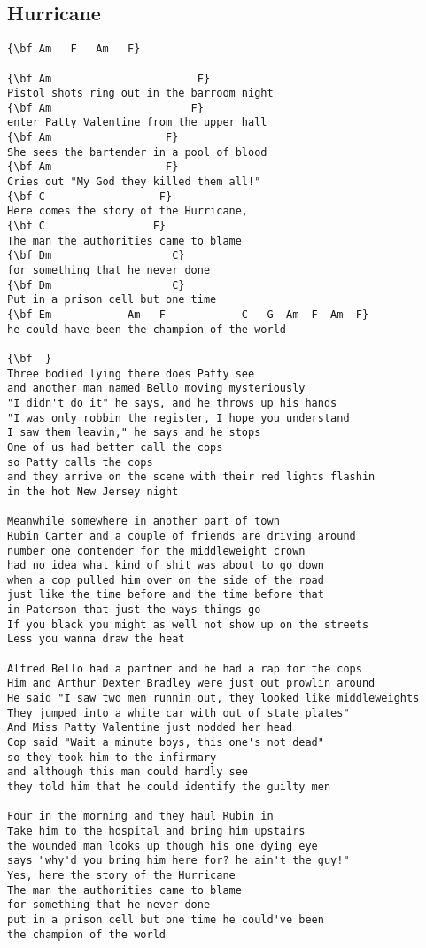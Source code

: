 \documentclass[a4paper]{article}
\begin{document}
\newpage
\subsection{Hurricane} %
\label{sub:Hurricane}
\begin{Verbatim}[commandchars=\\\{\}]
{\bf Am   F   Am   F}

{\bf Am                       F}
Pistol shots ring out in the barroom night
{\bf Am                      F}
enter Patty Valentine from the upper hall
{\bf Am                  F}
She sees the bartender in a pool of blood
{\bf Am                  F}
Cries out "My God they killed them all!"
{\bf C                  F}
Here comes the story of the Hurricane,
{\bf C                 F}
The man the authorities came to blame
{\bf Dm                   C}
for something that he never done
{\bf Dm                   C}
Put in a prison cell but one time
{\bf Em            Am   F            C   G  Am  F  Am  F}
he could have been the champion of the world

{\bf  }
Three bodied lying there does Patty see
and another man named Bello moving mysteriously
"I didn't do it" he says, and he throws up his hands
"I was only robbin the register, I hope you understand
I saw them leavin," he says and he stops
One of us had better call the cops
so Patty calls the cops
and they arrive on the scene with their red lights flashin
in the hot New Jersey night

Meanwhile somewhere in another part of town
Rubin Carter and a couple of friends are driving around
number one contender for the middleweight crown
had no idea what kind of shit was about to go down
when a cop pulled him over on the side of the road
just like the time before and the time before that
in Paterson that just the ways things go
If you black you might as well not show up on the streets
Less you wanna draw the heat

Alfred Bello had a partner and he had a rap for the cops
Him and Arthur Dexter Bradley were just out prowlin around
He said "I saw two men runnin out, they looked like middleweights
They jumped into a white car with out of state plates"
And Miss Patty Valentine just nodded her head
Cop said "Wait a minute boys, this one's not dead"
so they took him to the infirmary
and although this man could hardly see
they told him that he could identify the guilty men

Four in the morning and they haul Rubin in
Take him to the hospital and bring him upstairs
the wounded man looks up though his one dying eye
says "why'd you bring him here for? he ain't the guy!"
Yes, here the story of the Hurricane
The man the authorities came to blame
for something that he never done
put in a prison cell but one time he could've been
the champion of the world


\end{Verbatim}
\end{document}

